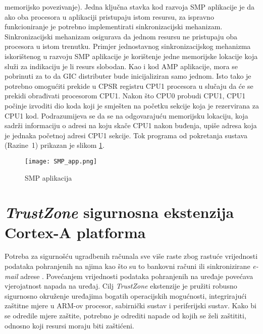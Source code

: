 \documentclass[times, utf8, diplomski, numeric]{fer}
\begin{document}
memorijsko povezivanje). Jedna ključna stavka kod razvoja SMP aplikacije je da ako oba procesora u aplikaciji pristupaju
istom resursu, za ispravno funkcioniranje je potrebno implementirati sinkronizacijski mehanizam. Sinkronizacijski mehanizam
osigurava da jednom resursu ne pristupaju oba procesora u istom trenutku. Primjer jednostavnog sinkronizacijskog mehanizma
iskorištenog u razvoju SMP aplikacije je korištenje jedne memorijske lokacije koja služi za indikaciju je li resurs slobodan.
Kao i kod AMP aplikacije, mora se pobrinuti za to da GIC distributer bude inicijaliziran samo jednom. Isto tako je potrebno
omogućiti prekide u CPSR registru CPU1 procesora u slučaju da će se prekidi obrađivati procesorom CPU1. Nakon što CPU0
probudi CPU1, CPU1 počinje izvoditi dio koda koji je smješten na početku sekcije koja je rezervirana za CPU1 kod.
Podrazumijeva se da se na odgovarajuću memorijsku lokaciju, koja sadrži informaciju o adresi na koju skače CPU1 nakon buđenja,
upiše adresa koja je jednaka početnoj adresi CPU1 sekcije. Tok programa od pokretanja sustava (Razine~1) prikazan je slikom
\ref{smp_app}.
\begin{figure}[H]
  \centering
	\texttt{[image: SMP\_app.png]}%
	\caption{SMP aplikacija}
	\label{smp_app}%
\end{figure}

\chapter{\textit{TrustZone} sigurnosna ekstenzija Cortex-A platforma}
Potreba za sigurnošću ugradbenih računala sve više raste zbog rastuće vrijednosti podataka pohranjenih na njima kao
što su to bankovni računi ili sinkronizirane \textit{e-mail} adrese \cite{tz_wp}. Povećanjem vrijednosti podataka pohranjenih na
uređaje povećava vjerojatnost napada na uređaj. Cilj \textit{TrustZone} ekstenzije je pružiti robusno sigurnosno okruženje
uređajima bogatih operacijskih mogućnosti, integrirajući zaštitne mjere u ARM-ov procesor, sabirnički sustav i periferijski
sustav. Kako bi se odredile mjere zaštite, potrebno je odrediti napade od kojih se želi zaštititi, odnosno koji resursi
moraju biti zaštićeni.
\end{document}
